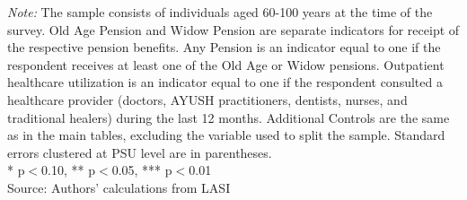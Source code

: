 \begin{table}[H]
\centering
\vspace{1.8mm}
\caption{Outpatient Healthcare Utilization and Pension: Heterogeneity by Gender}
\label{tab:het_gender}
\vspace{3mm}
\vspace{2mm}
\begin{minipage}{0.95\textwidth}
\footnotesize \textit{Note:} The sample consists of individuals aged 60-100 years at the time of the survey. Old Age Pension and Widow Pension are separate indicators for receipt of the respective pension benefits. Any Pension is an indicator equal to one if the respondent receives at least one of the Old Age or Widow pensions. Outpatient healthcare utilization is an indicator equal to one if the respondent consulted a healthcare provider (doctors, AYUSH practitioners, dentists, nurses, and traditional healers) during the last 12 months. Additional Controls are the same as in the main tables, excluding the variable used to split the sample. Standard errors clustered at PSU level are in parentheses. \\ * p$<$0.10, ** p$<$0.05, *** p$<$0.01\\
Source: Authors' calculations from LASI
\end{minipage}
\end{table}
